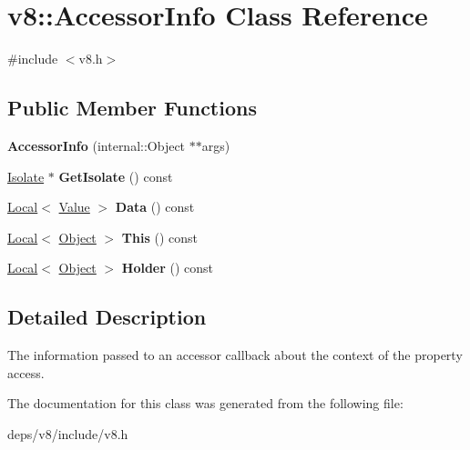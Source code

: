 \hypertarget{classv8_1_1_accessor_info}{}\section{v8\+:\+:Accessor\+Info Class Reference}
\label{classv8_1_1_accessor_info}


{\ttfamily \#include $<$v8.\+h$>$}

\subsection*{Public Member Functions}
\begin{DoxyCompactItemize}
\item 
\hypertarget{classv8_1_1_accessor_info_a4cf463121a7ca7f966145b1e16169b93}{}{\bfseries Accessor\+Info} (internal\+::\+Object $\ast$$\ast$args)\label{classv8_1_1_accessor_info_a4cf463121a7ca7f966145b1e16169b93}

\item 
\hypertarget{classv8_1_1_accessor_info_aa1d0780ab5580cb76103d37e790063f6}{}\hyperlink{classv8_1_1_isolate}{Isolate} $\ast$ {\bfseries Get\+Isolate} () const \label{classv8_1_1_accessor_info_aa1d0780ab5580cb76103d37e790063f6}

\item 
\hypertarget{classv8_1_1_accessor_info_a5731988db2cf66eb3cc7f757832d12f9}{}\hyperlink{classv8_1_1_local}{Local}$<$ \hyperlink{classv8_1_1_value}{Value} $>$ {\bfseries Data} () const \label{classv8_1_1_accessor_info_a5731988db2cf66eb3cc7f757832d12f9}

\item 
\hypertarget{classv8_1_1_accessor_info_afc7740ab0665f232f9f956a7e3ac6422}{}\hyperlink{classv8_1_1_local}{Local}$<$ \hyperlink{classv8_1_1_object}{Object} $>$ {\bfseries This} () const \label{classv8_1_1_accessor_info_afc7740ab0665f232f9f956a7e3ac6422}

\item 
\hypertarget{classv8_1_1_accessor_info_a1305bf63887da131db381122d34c7193}{}\hyperlink{classv8_1_1_local}{Local}$<$ \hyperlink{classv8_1_1_object}{Object} $>$ {\bfseries Holder} () const \label{classv8_1_1_accessor_info_a1305bf63887da131db381122d34c7193}

\end{DoxyCompactItemize}


\subsection{Detailed Description}
The information passed to an accessor callback about the context of the property access. 

The documentation for this class was generated from the following file\+:\begin{DoxyCompactItemize}
\item 
deps/v8/include/v8.\+h\end{DoxyCompactItemize}
